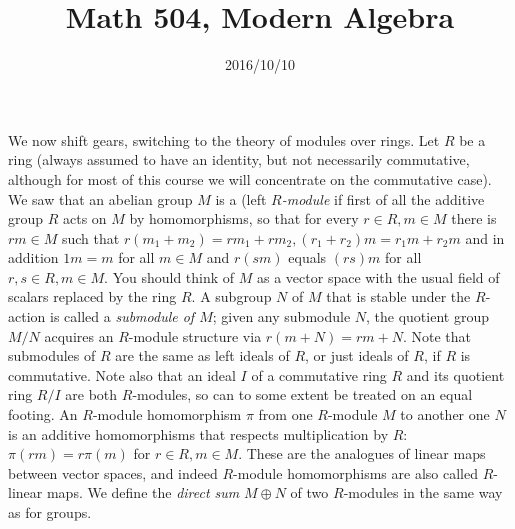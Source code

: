 \documentclass[10pt]{article}
\title{Math 504, Modern Algebra}
\date{2016/10/10}
\begin{document}
\maketitle

We now shift gears, switching to the theory of modules over rings. Let
$R$ be a ring (always assumed to have an identity, but not necessarily
commutative, although for most of this course we will concentrate on the
commutative case). We saw that an abelian group $M$ is a (left {\sl
  $R$-module} if first of all the additive group $R$ acts on $M$ by
homomorphisms, so that for every $r\in R, m\in M$ there is $rm\in M$
such that $r(m_1+m_2) = rm_1 + rm_2, (r_1+r_2)m = r_1 m + r_2 m$ and in
addition $1 m = m$ for all $m\in M$ and $r(sm)$ equals $(rs)m$ for all
$r,s\in R,m\in M$. You should think of $M$ as a vector space with the
usual field of scalars replaced by the ring $R$. A subgroup $N$ of $M$
that is stable under the $R$-action is called a {\sl submodule of $M$};
given any submodule $N$, the quotient group $M/N$ acquires an $R$-module
structure via $r(m+N) = rm + N$. Note that submodules of $R$ are the
same as left ideals of $R$, or just ideals of $R$, if $R$ is
commutative. Note also that an ideal $I$ of a commutative ring $R$ and
its quotient ring $R/I$ are both $R$-modules, so can to some extent be
treated on an equal footing. An $R$-module homomorphism $\pi$ from one
$R$-module $M$ to another one $N$ is an additive homomorphisms that
respects multiplication by $R$: $\pi(rm) = r\pi(m)$ for $r\in R,m\in M$.
These are the analogues of linear maps between vector spaces, and indeed
$R$-module homomorphisms are also called $R$-linear maps. We define the
{\sl direct sum} $M\oplus N$ of two $R$-modules in the same way as for
groups.
\end{document}
